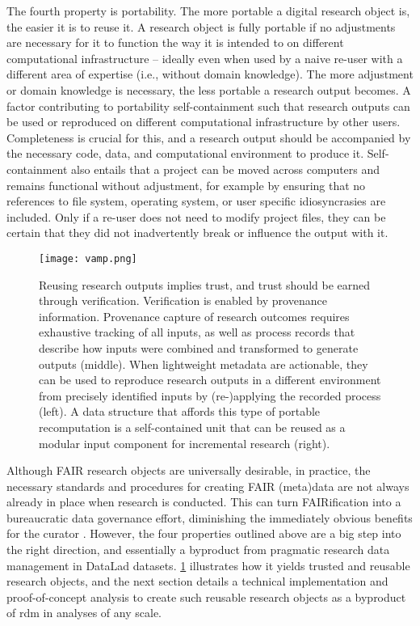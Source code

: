 The fourth property is portability.
The more portable a digital research object is, the easier it is to reuse it.
A research object is fully portable if no adjustments are necessary for it to function the way it is intended to on different computational infrastructure -- ideally even when used by a naive re-user with a different area of expertise (i.e., without domain knowledge).
The more adjustment or domain knowledge is necessary, the less portable a research output becomes.
A factor contributing to portability self-containment such that research outputs can be used or reproduced on different computational infrastructure by other users.
Completeness is crucial for this, and a research output should be accompanied by the necessary code, data, and computational environment to produce it.
Self-containment also entails that a project can be moved across computers and remains functional without adjustment, for example by ensuring that no references to file system, operating system, or user specific idiosyncrasies are included.
Only if a re-user does not need to modify project files, they can be certain that they did not inadvertently break or influence the output with it.

\begin{figure}
	\centering
	\texttt{[image: vamp.png]}
	\caption[DataLad datasets as reusable research objects]{Reusing research outputs implies trust, and trust should be earned through verification. Verification is enabled by provenance information. Provenance capture of research outcomes requires exhaustive tracking of all inputs, as well as process records that describe how inputs were combined and transformed to generate outputs (middle). When lightweight metadata are actionable, they can be used to reproduce research outputs in a different environment from precisely identified inputs by (re-)applying the recorded process (left). A data structure that affords this type of portable recomputation is a self-contained unit that can be reused as a modular input component for incremental research (right).
	}
	\label{fig:vamp}
\end{figure}





Although FAIR research objects are universally desirable, in practice, the necessary standards and procedures for creating FAIR (meta)data are not always already in place when research is conducted.
This can turn FAIRification into a bureaucratic data governance effort, diminishing the immediately obvious benefits for the curator \citep{zehl2016handling}.
However, the four properties outlined above are a big step into the right direction, and essentially a byproduct from pragmatic research data management in DataLad datasets.
\cref{fig:vamp} illustrates how it yields trusted and reusable research objects, and the next section details a technical implementation and proof-of-concept analysis to create such reusable research objects as a byproduct of \gls{rdm} in analyses of any scale.

